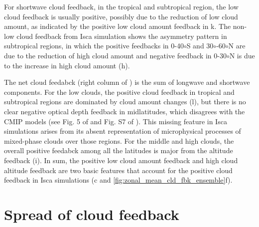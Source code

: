 For shortwave cloud feedback, in the tropical and subtropical region, the low cloud feedback is usually positive, possibly due to the reduction of low cloud amount, as indicated by the positive low cloud amount feedback in k. The non-low cloud feedback from Isca simulation shows the asymmetry pattern in subtropical regions, in which the positive feedbacks in 0-40$\circ$S and 30$\circ$-60$\circ$N are due to the reduction of high cloud amount  and negative feedback in 0-30$\circ$N is due to the increase in high cloud amount (h). 

The net cloud feedabck (right column of ) is the sum of longwave and shortwave components. For the low clouds, the positive cloud feedback in tropical and subtropical regions are dominated by cloud amount changes (l), but there is no clear negative optical depth feedback in midlatitudes, which disagrees with the CMIP models (see Fig. 5 of \citealt{Sherwood2020} and Fig. S7 of \citealt{Zelinka2016insights}). This missing feature in Isca simulations arises from its absent representation of microphysical processes of mixed-phase clouds over those regions. For the middle and high clouds, the overall positive feedabck among all the latitudes is major from the altitude feedback (i). In sum, the positive low cloud amount feedback and high cloud altitude feedback are two basic features that account for the positive cloud feedback in Isca simulations (c and \ref{fig:zonal_mean_cld_fbk_ensemble}f).

\section{Spread of cloud feedback}
\label{sec:spread_of_cld_fbk_in_PPE}

